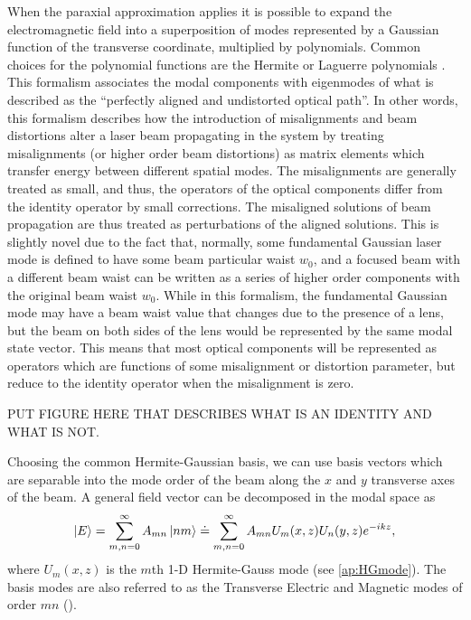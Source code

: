 When the paraxial approximation applies it is possible to expand the electromagnetic field into a superposition of modes represented by a Gaussian function of the transverse coordinate, multiplied by polynomials. %
Common choices for the polynomial functions are the Hermite or Laguerre polynomials \cite[chap.16]{Siegman}. %
This formalism associates the modal components with eigenmodes of what is described as the ``perfectly aligned and undistorted optical path''. %
In other words, this formalism describes how the introduction of misalignments and beam distortions alter a laser beam propagating in the system by treating misalignments (or higher order beam distortions) as matrix elements which transfer energy between different spatial modes. %
The misalignments are generally treated as small, and thus, the operators of the optical components differ from the identity operator by small corrections. %
The misaligned solutions of beam propagation are thus treated as perturbations of the aligned solutions. %
This is slightly novel due to the fact that, normally, some fundamental Gaussian laser mode is defined to have some beam particular waist $w_0$, and a focused beam with a different beam waist can be written as a series of higher order components with the original beam waist $w_0$. %
While in this formalism, the fundamental Gaussian mode may have a beam waist value that changes due to the presence of a lens, but the beam on both sides of the lens would be represented by the same modal state vector. %
This means that most optical components will be represented as operators which are functions of some misalignment or distortion parameter, but reduce to the identity operator when the misalignment is zero.

{\color{red} PUT FIGURE HERE THAT DESCRIBES WHAT IS AN IDENTITY AND WHAT IS NOT.}

Choosing the common Hermite-Gaussian basis, we can use basis vectors which are separable into the mode order of the beam along the $x$ and $y$ transverse axes of the beam. %
A general field vector can be decomposed in the modal space as
\begin{equation}
\left| E \right> = \sum_{m,n=0}^\infty A_{mn}\left| nm \right>\doteq\sum_{m,n=0}^\infty A_{mn}U_m(x,z)U_n(y,z)e^{-ikz},
\end{equation}
where $U_m(x,z)$ is the $m$th 1-D Hermite-Gauss mode (see \ref{ap:HGmode}). %
The basis modes are also referred to as the Transverse Electric and Magnetic modes of order $mn$ ().

